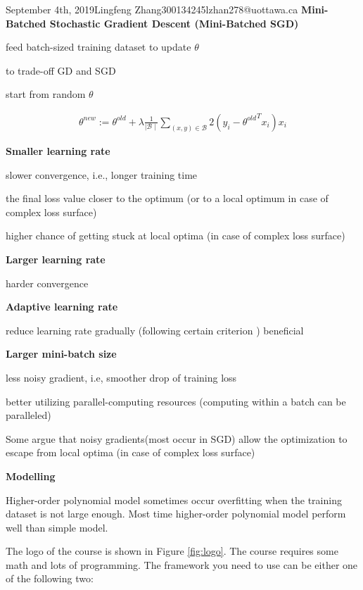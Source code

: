 \documentclass{article}
\begin{document}
\begin{lecture}{September 4th, 2019}{Lingfeng Zhang}{300134245}{lzhan278@uottawa.ca}
\textbf{Mini-Batched Stochastic Gradient Descent (Mini-Batched SGD)}

feed batch-sized training dataset to update $\theta$ 

to trade-off GD and SGD

start from random $\theta$

\begin{eqnarray}
\theta^{new} := \theta^{old} + \lambda\frac{1}{\mid\mathcal{B}\mid}\sum_{(x,y)\in\mathcal{B}}2(y_i-{\theta^{old}} ^T x_i)x_i
\end{eqnarray}

\textbf{Smaller learning rate}

slower convergence, i.e., longer training time

the final loss value closer to the optimum (or to a local optimum in case of complex loss surface)

higher chance of getting stuck at local optima (in case of complex loss surface)

\textbf{Larger learning rate}

harder convergence

\textbf{Adaptive learning rate}

reduce learning rate gradually (following certain criterion
)
beneficial

\textbf{Larger mini-batch size}

less noisy gradient, i.e, smoother drop of training loss

better utilizing parallel-computing resources (computing within a batch can be paralleled)

Some argue that noisy gradients(most occur in SGD) allow the optimization to escape from local optima (in case of complex loss surface)


\textbf{Modelling}

Higher-order polynomial model sometimes occur overfitting when the training dataset is not large enough. Most time higher-order polynomial model perform well than simple model.





















The logo of the course is shown in Figure \ref{fig:logo}. The course requires some math and lots of programming. The framework you need to use can be either one of the following two:


\end{lecture}
\end{document}

